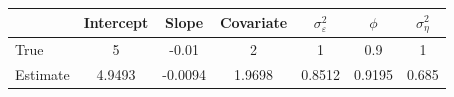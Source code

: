 \begin{tabular}{lcccccc}
\toprule
& Intercept & Slope & Covariate & $\sigma_\varepsilon^2$ & $\phi$ & $\sigma_\eta^2$ \\
\midrule
True & 5 & -0.01 & 2 & 1 & 0.9 & 1 \\
Estimate & 4.9493 & -0.0094 & 1.9698 & 0.8512 & 0.9195 & 0.685 \\
\bottomrule
\end{tabular}
